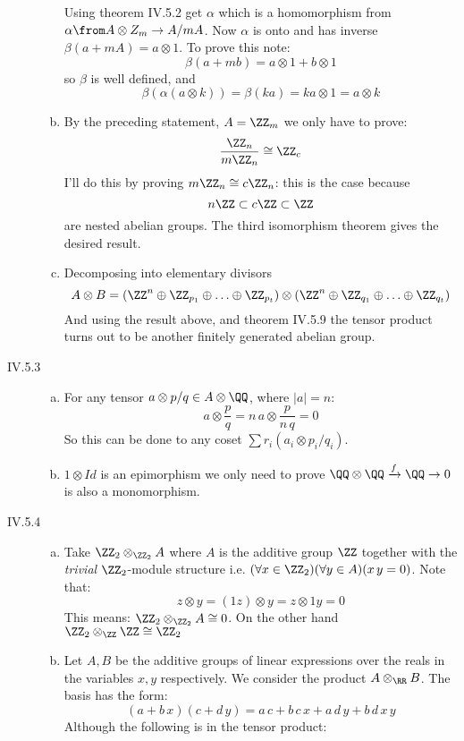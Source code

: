 \begin{description}
\begin{enumerate}[(a)]
    Using theorem IV.5.2 get $\alpha$ which is a homomorphism from $\alpha \from A\otimes Z_m \to A/mA$. Now $ \alpha$ is onto and has inverse $\beta(a+mA)=a\otimes 1$. To prove this note:
    $$\beta(a + mb) = a\otimes 1 + b\otimes 1$$
    so $\beta$ is well defined, and
    $$\beta(\alpha(a\otimes k)) = \beta(ka) = ka\otimes 1 = a\otimes k$$
\item By the preceding statement, $A= \ZZ_m$ we only have to prove:
    $$\frac{\ZZ_n}{m\ZZ_n} \cong \ZZ_c$$
   I'll do this by proving $m\ZZ_n \cong c\ZZ_n$: this is the case because
   $$n\ZZ \subset c\ZZ \subset \ZZ$$
   are nested abelian groups. The third isomorphism theorem gives the desired result.
\item Decomposing into elementary divisors $$A\otimes B=(\ZZ^n\oplus\ZZ_{p_1}\oplus \ldots \oplus \ZZ_{p_t})\otimes(\ZZ^n\oplus\ZZ_{q_1}\oplus \ldots \oplus \ZZ_{q_t})$$
    And using the result above, and theorem IV.5.9 the tensor product turns out to be another finitely generated abelian group.
\end{enumerate}
\item[IV.5.3]
    \begin{enumerate}[(a)]
        \item For any tensor $a\otimes p/q \in A\otimes \QQ$, where $|a|=n$:
            $$a\otimes \frac pq = n\,a\otimes \frac p{n\,q} = 0$$
            So this can be done to any coset $\sum r_i(a_i\otimes p_i/q_i)$.
        \item $1\otimes Id $ is an epimorphism we only need to prove $\QQ\otimes \QQ \xrightarrow{f} \QQ \to 0$ is also a monomorphism.
    \end{enumerate}
\item[IV.5.4]
    \begin{enumerate}[(a)]
        \item Take $\ZZ_2\otimes_{\ZZ_2} A$ where $A$ is the additive group $\ZZ$ together with the \emph{trivial} $\ZZ_2$-module structure i.e. $(\forall x\in \ZZ_2)(\forall y\in A)(x\,y=0)$. Note that:
            $$z\otimes y = (1z)\otimes y = z \otimes 1y = 0$$
            This means: $\ZZ_2\otimes_{\ZZ_2} A\cong {0}$. On the other hand $\ZZ_2\otimes_{\ZZ} \ZZ\cong\ZZ_2$
        \item Let $A,B$ be the additive groups of linear expressions over the reals in the variables $x,y$ respectively. We consider the product $A\otimes_\RR B$. The basis has the form:
            $$(a+b\,x)(c+d\,y)=a\,c + b\,c\,x + a\,d\,y + b\,d\,x\,y$$
            Although the following is in the tensor product:

\end{enumerate}
\end{description}
